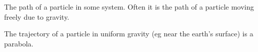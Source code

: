 The path of a particle in some system. Often it is the path
of a particle moving freely due to gravity. 
\par
The trajectory of a particle in uniform gravity (eg near 
the earth's surface) is a parabola.